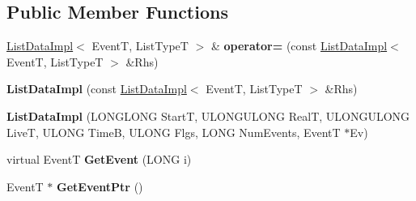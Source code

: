 \subsection*{Public Member Functions}
\begin{DoxyCompactItemize}
\item 
\mbox{\label{class_canberra_1_1_data_types_1_1_spectroscopy_1_1_list_data_impl_af23f27f81d426b3fe4370e71073140d7}} 
\hyperlink{class_canberra_1_1_data_types_1_1_spectroscopy_1_1_list_data_impl}{List\+Data\+Impl}$<$ EventT, List\+TypeT $>$ \& {\bfseries operator=} (const \hyperlink{class_canberra_1_1_data_types_1_1_spectroscopy_1_1_list_data_impl}{List\+Data\+Impl}$<$ EventT, List\+TypeT $>$ \&Rhs)
\item 
\mbox{\label{class_canberra_1_1_data_types_1_1_spectroscopy_1_1_list_data_impl_a20278b8b7968ae2113034e2e1aa49706}} 
{\bfseries List\+Data\+Impl} (const \hyperlink{class_canberra_1_1_data_types_1_1_spectroscopy_1_1_list_data_impl}{List\+Data\+Impl}$<$ EventT, List\+TypeT $>$ \&Rhs)
\item 
\mbox{\label{class_canberra_1_1_data_types_1_1_spectroscopy_1_1_list_data_impl_adc87a0c39b52a6d9e58253b387fc2dc9}} 
{\bfseries List\+Data\+Impl} (L\+O\+N\+G\+L\+O\+NG StartT, U\+L\+O\+N\+G\+U\+L\+O\+NG RealT, U\+L\+O\+N\+G\+U\+L\+O\+NG LiveT, U\+L\+O\+NG TimeB, U\+L\+O\+NG Flgs, L\+O\+NG Num\+Events, EventT $\ast$Ev)
\item 
\mbox{\label{class_canberra_1_1_data_types_1_1_spectroscopy_1_1_list_data_impl_a14e5b071cd4c494511bb06fec83496db}} 
virtual EventT {\bfseries Get\+Event} (L\+O\+NG i)
\item 
\mbox{\label{class_canberra_1_1_data_types_1_1_spectroscopy_1_1_list_data_impl_a89f9631769bb3487dc867a1cb4000e06}} 
EventT $\ast$ {\bfseries Get\+Event\+Ptr} ()
\item 
\mbox{\label{class_canberra_1_1_data_types_1_1_spectroscopy_1_1_list_data_impl_a80cdeb10e7d40c63929f3c6abbabac8c}} 

\end{DoxyCompactItemize}
